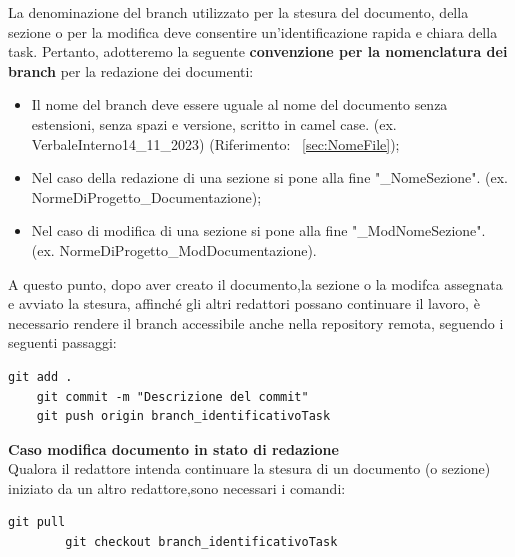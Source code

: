 \documentclass{article}
\begin{document}
La denominazione del branch utilizzato per la stesura del documento, della sezione o per la modifica deve consentire un'identificazione rapida e chiara della task. Pertanto, adotteremo la seguente \textbf{convenzione per la nomenclatura dei branch} per la redazione dei documenti:
\begin{itemize}
    \item  Il nome del branch deve essere uguale al nome del documento senza estensioni, senza spazi e versione, scritto in camel case. (ex. VerbaleInterno14\_11\_2023) (Riferimento: ~\ref{sec:NomeFile});
    \item  Nel caso della redazione di una sezione si pone alla fine "\_NomeSezione". (ex. NormeDiProgetto\_Documentazione);
    \item Nel caso di modifica di una sezione si pone alla fine "\_ModNomeSezione". (ex. NormeDiProgetto\_ModDocumentazione).
\end{itemize}

A questo punto, dopo aver creato il documento,la sezione o la modifca assegnata e avviato la stesura, affinché gli altri redattori possano continuare il lavoro, è necessario rendere il branch accessibile anche nella repository remota, seguendo i seguenti passaggi:
\begin{lstlisting}[style=code]
    git add .
    git commit -m "Descrizione del commit"
    git push origin branch_identificativoTask
        \end{lstlisting}




\textbf{Caso modifica documento in stato di redazione}\\
Qualora il redattore intenda continuare la stesura di un documento (o sezione) iniziato da un altro redattore,sono necessari i comandi:

\begin{lstlisting}[style=code]
        git pull
        git checkout branch_identificativoTask

        \end{lstlisting}
\end{document}
